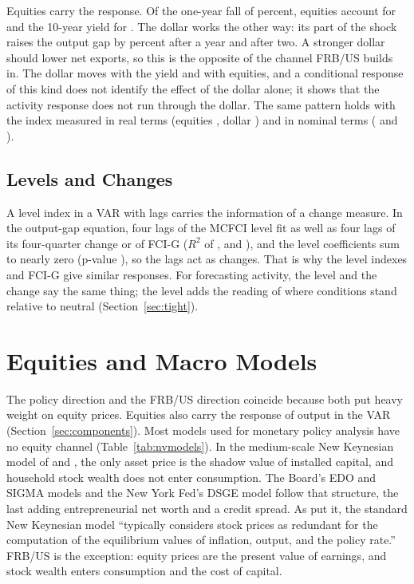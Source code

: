 \documentclass[11pt]{article}
\begin{document}
Equities carry the response. Of the one-year fall of  percent, equities account for  and the 10-year yield for . The dollar works the other way: its part of the shock raises the output gap by  percent after a year and  after two. A stronger dollar should lower net exports, so this is the opposite of the channel FRB/US builds in. The dollar moves with the yield and with equities, and a conditional response of this kind does not identify the effect of the dollar alone; it shows that the activity response does not run through the dollar. The same pattern holds with the index measured in real terms (equities , dollar ) and in nominal terms ( and ).



\subsection{Levels and Changes}\label{sec:levelchange}
A level index in a VAR with lags carries the information of a change measure. In the output-gap equation, four lags of the MCFCI level fit as well as four lags of its four-quarter change or of FCI-G ($R^2$ of ,  and ), and the level coefficients sum to nearly zero (p-value ), so the lags act as changes. That is why the level indexes and FCI-G give similar responses. For forecasting activity, the level and the change say the same thing; the level adds the reading of where conditions stand relative to neutral (Section~\ref{sec:tight}).

\section{Equities and Macro Models}\label{sec:models}
The policy direction and the FRB/US direction coincide because both put heavy weight on equity prices. Equities also carry the response of output in the VAR (Section~\ref{sec:components}). Most models used for monetary policy analysis have no equity channel (Table~\ref{tab:nvmodels}). In the medium-scale New Keynesian model of \citet{christiano2005} and \citet{smets2007}, the only asset price is the shadow value of installed capital, and household stock wealth does not enter consumption. The Board's EDO and SIGMA models and the New York Fed's DSGE model follow that structure, the last adding entrepreneurial net worth and a credit spread. As \citet{castelnuovo2010} put it, the standard New Keynesian model ``typically considers stock prices as redundant for the computation of the equilibrium values of inflation, output, and the policy rate.'' FRB/US is the exception: equity prices are the present value of earnings, and stock wealth enters consumption and the cost of capital.
\end{document}
